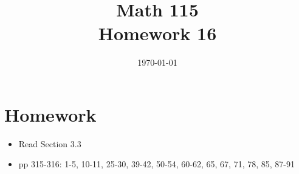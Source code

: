 \documentclass[fleqn,addpoints]{exam}
\title{Math 115 \\ Homework 16}
\date{\today}
\begin{document}
\maketitle


\section{Homework}

\begin{itemize}
  \item Read Section 3.3
  \item pp 315-316: 1-5, 10-11, 25-30, 39-42, 50-54, 60-62, 65, 67, 71, 78, 85, 87-91
\end{itemize}
\end{document}
